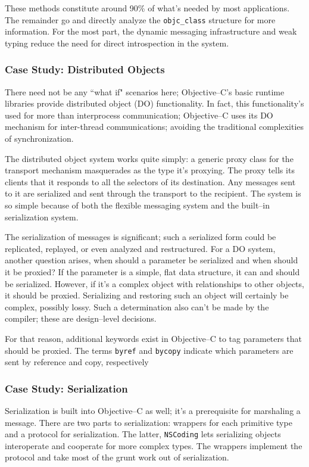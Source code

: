 These methods constitute around 90\% of what's needed by most applications.  The remainder go and directly analyze the \texttt{objc\_class} structure for more information.  For the most part, the dynamic messaging infrastructure and weak typing reduce the need for direct introspection in the system.

\subsubsection{Case Study: Distributed Objects}

There need not be any ``what if" scenarios here; Objective--C's basic runtime
libraries provide distributed object (DO) functionality. In fact, this
functionality's used for more than interprocess communication; Objective--C
uses its DO mechanism for inter-thread communications; avoiding the
traditional complexities of synchronization.

The distributed object system works quite simply: a generic proxy class for
the transport mechanism masquerades as the type it's proxying. The proxy tells
its clients that it responds to all the selectors of its destination. Any
messages sent to it are serialized and sent through the transport to the
recipient. The system is so simple because of both the flexible messaging
system and the built--in serialization system.

The serialization of messages is significant; such a serialized form could be
replicated, replayed, or even analyzed and restructured. For a DO system,
another question arises, when should a parameter be serialized and when should
it be proxied? If the parameter is a simple, flat data structure, it can and
should be serialized. However, if it's a complex object with relationships to
other objects, it should be proxied. Serializing and restoring such an object
will certainly be complex, possibly lossy. Such a determination also can't be
made by the compiler; these are design--level decisions.

For that reason, additional keywords exist in Objective--C to tag parameters
that should be proxied. The terms \texttt{byref} and \texttt{bycopy} indicate
which parameters are sent by reference and copy, respectively

\subsubsection{Case Study: Serialization}

Serialization is built into Objective--C as well; it's a prerequisite for
marshaling a message. There are two parts to serialization: wrappers for each
primitive type and a protocol for serialization. The latter, \texttt{NSCoding}
lets serializing objects interoperate and cooperate for more complex types.
The wrappers implement the protocol and take most of the grunt work out of
serialization.

